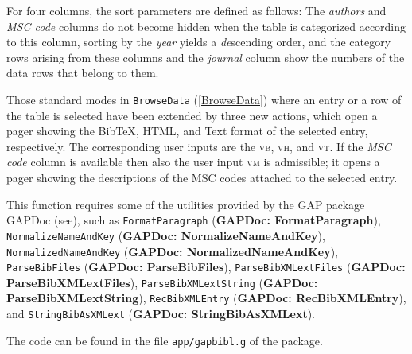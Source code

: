 \documentclass[a4paper,11pt]{report}
\begin{document}
{{{ For four columns, the sort parameters are defined as follows: The \emph{authors} and \emph{MSC code} columns do not become hidden when the table is categorized according to this
column, sorting by the \emph{year} yields a \emph{de}scending order, and the category rows arising from these columns and the \emph{journal} column show the numbers of the data rows that belong to them. 

 Those standard modes in \texttt{BrowseData} (\ref{BrowseData}) where an entry or a row of the table is selected have been extended by three
new actions, which open a pager showing the Bib{\TeX}, HTML, and Text format of the selected entry, respectively. The corresponding
user inputs are the \textsc{vb}, \textsc{vh}, and \textsc{vt}. If the \emph{MSC code} column is available then also the user input \textsc{vm} is admissible; it opens a pager showing the descriptions of the MSC codes
attached to the selected entry. 

 This function requires some of the utilities provided by the \textsf{GAP} package \textsf{GAPDoc} (see{\nobreakspace}\cite{GAPDoc}), such as \texttt{FormatParagraph} (\textbf{GAPDoc: FormatParagraph}), \texttt{NormalizeNameAndKey} (\textbf{GAPDoc: NormalizeNameAndKey}), \texttt{NormalizedNameAndKey} (\textbf{GAPDoc: NormalizedNameAndKey}), \texttt{ParseBibFiles} (\textbf{GAPDoc: ParseBibFiles}), \texttt{ParseBibXMLextFiles} (\textbf{GAPDoc: ParseBibXMLextFiles}), \texttt{ParseBibXMLextString} (\textbf{GAPDoc: ParseBibXMLextString}), \texttt{RecBibXMLEntry} (\textbf{GAPDoc: RecBibXMLEntry}), and \texttt{StringBibAsXMLext} (\textbf{GAPDoc: StringBibAsXMLext}). 

 The code can be found in the file \texttt{app/gapbibl.g} of the package. 

}}}
\end{document}
